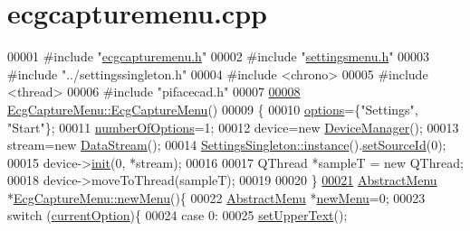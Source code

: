 \hypertarget{ecgcapturemenu_8cpp_source}{}\section{ecgcapturemenu.\+cpp}
\label{ecgcapturemenu_8cpp_source}

\begin{DoxyCode}
00001 \textcolor{preprocessor}{#include "\hyperlink{ecgcapturemenu_8h}{ecgcapturemenu.h}"}
00002 \textcolor{preprocessor}{#include "\hyperlink{settingsmenu_8h}{settingsmenu.h}"}
00003 \textcolor{preprocessor}{#include "../settingssingleton.h"}
00004 \textcolor{preprocessor}{#include <chrono>}
00005 \textcolor{preprocessor}{#include <thread>}
00006 \textcolor{preprocessor}{#include "pifacecad.h"}
00007 
\hypertarget{ecgcapturemenu_8cpp_source.tex_l00008}{}\hyperlink{classEcgCaptureMenu_ac430bc0a2eb1879fe77cd0133d4dd704}{00008} \hyperlink{classEcgCaptureMenu_ac430bc0a2eb1879fe77cd0133d4dd704}{EcgCaptureMenu::EcgCaptureMenu}()
00009 \{
00010     \hyperlink{classAbstractMenu_a990dc4299fbe86152487fd35d46a403b}{options}=\{\textcolor{stringliteral}{"Settings"}, \textcolor{stringliteral}{"Start"}\};
00011     \hyperlink{classAbstractMenu_a6caff7f6281c6c2912e5f808c2906123}{numberOfOptions}=1;
00012     device=\textcolor{keyword}{new} \hyperlink{classDeviceManager}{DeviceManager}();
00013     stream=\textcolor{keyword}{new} \hyperlink{classDataStream}{DataStream}();
00014     \hyperlink{classSettingsSingleton_aad528becd7ce5903c418a5b8b718074c}{SettingsSingleton::instance}().\hyperlink{classSettingsSingleton_af4b9b4364b4146711000f425dd5f5aa9}{setSourceId}(0);
00015     device->\hyperlink{classDeviceManager_a280116304655de3a0bbfbf49730f9384}{init}(0, *stream);
00016 
00017     QThread *sampleT = \textcolor{keyword}{new} QThread;
00018     device->moveToThread(sampleT);
00019 
00020 \}
\hypertarget{ecgcapturemenu_8cpp_source.tex_l00021}{}\hyperlink{classEcgCaptureMenu_a610d2985e09cd56cb381e6e443dbbc72}{00021} \hyperlink{classAbstractMenu}{AbstractMenu} *\hyperlink{classEcgCaptureMenu_a610d2985e09cd56cb381e6e443dbbc72}{EcgCaptureMenu::newMenu}()\{
00022     \hyperlink{classAbstractMenu}{AbstractMenu} *\hyperlink{classEcgCaptureMenu_a610d2985e09cd56cb381e6e443dbbc72}{newMenu}=0;
00023     \textcolor{keywordflow}{switch} (\hyperlink{classAbstractMenu_a589fea1bf68c33e0eff64c8b609cb980}{currentOption})\{
00024     \textcolor{keywordflow}{case} 0:
00025         \hyperlink{classAbstractMenu_a4163c42d2127430e184612cb95211cda}{setUpperText}();

\end{DoxyCode}
